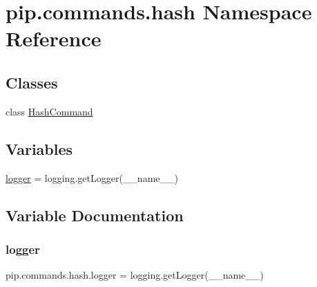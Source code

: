 \hypertarget{namespacepip_1_1commands_1_1hash}{}\section{pip.\+commands.\+hash Namespace Reference}
\label{namespacepip_1_1commands_1_1hash}
\subsection*{Classes}
\begin{DoxyCompactItemize}
\item 
class \hyperlink{classpip_1_1commands_1_1hash_1_1_hash_command}{Hash\+Command}
\end{DoxyCompactItemize}
\subsection*{Variables}
\begin{DoxyCompactItemize}
\item 
\hyperlink{namespacepip_1_1commands_1_1hash_aa31610f4571538450a30f6c5c3d4f730}{logger} = logging.\+get\+Logger(\+\_\+\+\_\+name\+\_\+\+\_\+)
\end{DoxyCompactItemize}


\subsection{Variable Documentation}
\mbox{\label{namespacepip_1_1commands_1_1hash_aa31610f4571538450a30f6c5c3d4f730}} 
\subsubsection{\texorpdfstring{logger}{logger}}
{\footnotesize\ttfamily pip.\+commands.\+hash.\+logger = logging.\+get\+Logger(\+\_\+\+\_\+name\+\_\+\+\_\+)}


